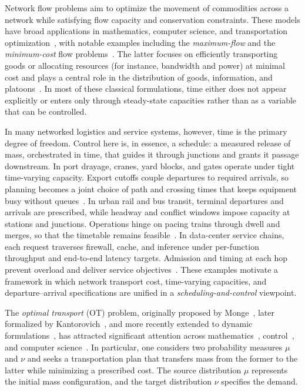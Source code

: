 \documentclass[11pt]{article}
\begin{document}
Network flow problems aim to optimize the movement of commodities across a network while satisfying flow capacity and conservation constraints. These models have broad applications in mathematics, computer science, and transportation optimization~\cite{ahuja1988network}, with notable examples including the \emph{maximum-flow} and the \emph{minimum-cost} flow problems~\cite{dantzig2016linear}. The latter focuses on efficiently transporting goods or allocating resources (for instance, bandwidth and power) at minimal cost and plays a central role in the distribution of goods, information, and platoons~\cite{ekren2018constrained,haasler2024scalable}. In most of these classical formulations, time either does not appear explicitly or enters only through steady-state capacities rather than as a variable that can be controlled.

In many networked logistics and service systems, however, time is the primary degree of freedom. Control here is, in essence, a schedule: a measured release of mass, orchestrated in time, that guides it through junctions and grants it passage downstream. In port drayage, cranes, yard blocks, and gates operate under tight time-varying capacity. Export cutoffs couple departures to required arrivals, so planning becomes a joint choice of path and crossing times that keeps equipment busy without queues~\cite{steenken2004container}. In urban rail and bus transit, terminal departures and arrivals are prescribed, while headway and conflict windows impose capacity at stations and junctions. Operations hinge on pacing trains through dwell and merges, so that the timetable remains feasible~\cite{cacchiani2012nominal}. In data-center service chains, each request traverses firewall, cache, and inference under per-function throughput and end-to-end latency targets. Admission and timing at each hop prevent overload and deliver service objectives~\cite{mijumbi2015network}. These examples motivate a framework in which network transport cost, time-varying capacities, and departure–arrival specifications are unified in a \emph{scheduling-and-control} viewpoint.

The \emph{optimal transport} (OT) problem, originally proposed by Monge~\cite{monge1781memoire}, later formalized by Kantorovich~\cite{kantorovich1942translocation}, and more recently extended to dynamic formulations~\cite{benamou2000computational}, has attracted significant attention across mathematics~\cite{villani2009optimal}, control~\cite{chen2016optimal,chen2021optimal,eldesoukey2024schrodinger}, and computer science~\cite{peyre2019computational}. In particular, one considers two probability measures $\mu$ and $\nu$ and seeks a transportation plan that transfers mass from the former to the latter while minimizing a prescribed cost. The source distribution $\mu$ represents the initial mass configuration, and the target distribution $\nu$ specifies the demand.
\end{document}
